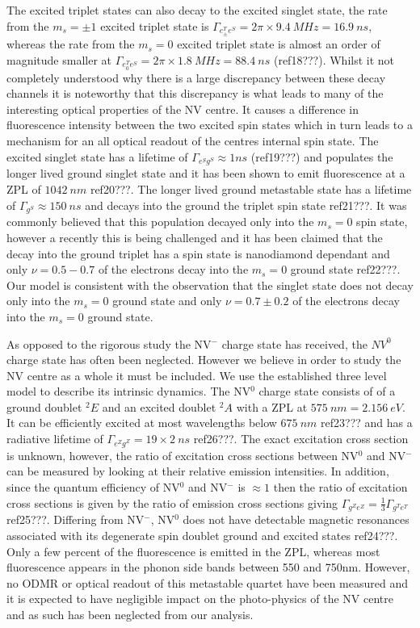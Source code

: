 \documentclass[prl]{revtex4}
\begin{document}
The excited triplet states can also decay to the excited singlet state, the rate from the $m_s=\pm1$ excited triplet state is $\Gamma_{e_\pm^Te^S} = 2\pi\times9.4\SI{}{MHz} = \SI{16.9}{ns}$, whereas the rate from the $m_s=0$ excited triplet state is almost an order of magnitude smaller at $\Gamma_{e_0^Te^S} =  2 \pi\times1.8 \SI{}{MHz} = \SI{88.4}{ns}$ (ref18???). Whilst it not completely understood why there is a large discrepancy between these decay channels it is noteworthy that this discrepancy is what leads to many of the interesting optical properties of the NV centre. It causes a difference in fluorescence intensity between the two excited spin states which in turn leads to a mechanism for an all optical readout of the centres internal spin state. The excited singlet state has a lifetime of $\Gamma_{e^Sg^S} \approx\si{1}{ns}$ (ref19???) and populates the longer lived ground singlet state and it has been shown to emit fluorescence at a ZPL of $\SI{1042}{nm}$ ref20???. The longer lived ground metastable state has a lifetime of $\Gamma_{g^S} \approx \SI{150}{ns}$ and decays into the ground the triplet spin state ref21???. It was commonly believed that this population decayed only into the $m_s=0$ spin state, however a recently this is being challenged and it has been claimed that the decay into the ground triplet has a spin state is nanodiamond dependant and only $\nu = 0.5-0.7$ of the electrons decay into the $m_s=0$ ground state ref22???. Our model is consistent with the observation that the singlet state does not decay only into the $m_s=0$ ground state and only $\nu = 0.7 \pm 0.2$ of the electrons decay into the $m_s=0$ ground state.

As opposed to the rigorous study the NV$^-$ charge state has received, the $NV^0$ charge state has often been neglected. However we believe in order to study the NV centre as a whole it must be included. We use the established three level model to describe its intrinsic dynamics. The NV$^0$ charge state consists of of a ground doublet $^2E$ and an excited doublet $^2A$ with a ZPL at $\SI{575}{nm} = \SI{2.156}{eV}$.  It can be efficiently excited at most wavelengths below $\SI{675}{nm}$ ref23??? and has a radiative lifetime of $\Gamma_{e^Zg^Z} = 19\times2 \SI{}{ns}$ ref26???. The exact excitation cross section is unknown, however, the ratio of excitation cross sections between NV$^0$ and NV$^-$ can be measured by looking at their relative emission intensities. In addition, since the quantum efficiency of NV$^0$ and NV$^-$ is $\approx 1$ then the ratio of excitation cross sections is given by the ratio of emission cross sections giving $\Gamma_{g^Ze^Z} = \frac{1}{3} \Gamma_{g^Te^T}$ ref25???. Differing from NV$^-$, NV$^0$ does not have detectable magnetic resonances associated with its degenerate spin doublet ground and excited states ref24???. Only a few percent of the fluorescence is emitted in the ZPL, whereas most fluorescence appears in the phonon side bands between 550 and 750nm. However, no ODMR or optical readout of this metastable quartet have been measured and it is expected to have negligible impact on the photo-physics of the NV centre and as such has been neglected from our analysis. 
\end{document}
